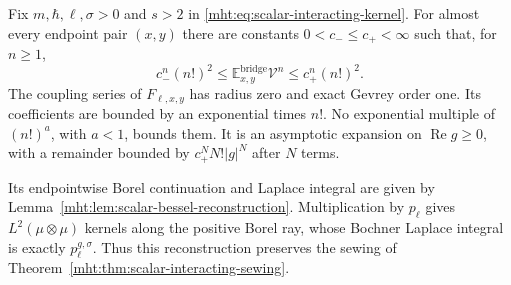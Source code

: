 \begin{theorem}\label{mht:thm:scalar-quartic-borel}
Fix $m,\hbar,\ell,\sigma>0$ and $s>2$ in
\eqref{mht:eq:scalar-interacting-kernel}. For almost every endpoint pair $(x,y)$ there
are constants $0<c_-\leq c_+<\infty$ such that, for $n\geq1$,
\begin{equation}\label{mht:eq:scalar-gevrey}
 c_-^n(n!)^2\leq\mathbb E_{x,y}^{\mathrm{bridge}}\mathcal V^n\leq c_+^n(n!)^2.
\end{equation}
The coupling series of $F_{\ell,x,y}$ has radius zero and exact
Gevrey order one. Its coefficients are bounded by an exponential
times $n!$. No exponential multiple of $(n!)^a$, with $a<1$,
bounds them. It is an asymptotic expansion on $\operatorname{Re}g\geq0$,
with a remainder bounded by $c_+^N N!|g|^N$ after $N$ terms.

Its endpointwise Borel continuation and Laplace integral are given by
Lemma~\ref{mht:lem:scalar-bessel-reconstruction}. Multiplication by $p_\ell$ gives
$L^2(\mu\otimes\mu)$ kernels along the positive Borel ray, whose
Bochner Laplace integral is exactly $p_\ell^{g,\sigma}$.
Thus this reconstruction preserves the sewing of
Theorem~\ref{mht:thm:scalar-interacting-sewing}.
\end{theorem}
